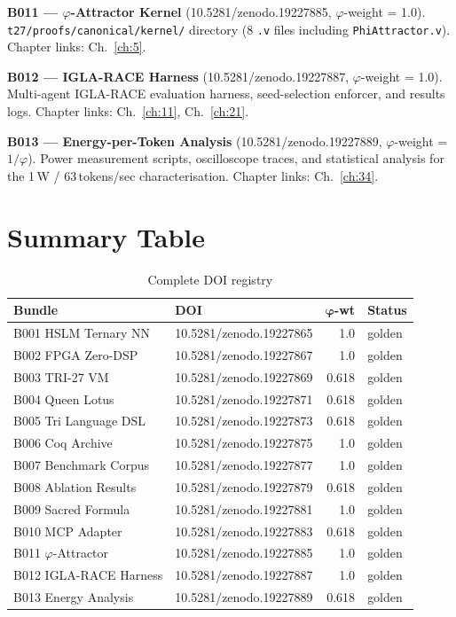\textbf{B011 --- $\varphi$-Attractor Kernel} (10.5281/zenodo.19227885, $\varphi$-weight = 1.0).
\texttt{t27/proofs/canonical/kernel/} directory (8 \texttt{.v} files including \texttt{PhiAttractor.v}). Chapter links: Ch.~\ref{ch:5}.

\textbf{B012 --- IGLA-RACE Harness} (10.5281/zenodo.19227887, $\varphi$-weight = 1.0).
Multi-agent IGLA-RACE evaluation harness, seed-selection enforcer, and results logs. Chapter links: Ch.~\ref{ch:11}, Ch.~\ref{ch:21}.

\textbf{B013 --- Energy-per-Token Analysis} (10.5281/zenodo.19227889, $\varphi$-weight = $1/\varphi$).
Power measurement scripts, oscilloscope traces, and statistical analysis for the 1\,W / 63\,tokens/sec characterisation. Chapter links: Ch.~\ref{ch:34}.

\section{Summary Table}

\begin{table}[h]
\centering
\caption{Complete DOI registry}
\label{tab:doi-registry}
\begin{tabular}{llrl}
\toprule
\textbf{Bundle} & \textbf{DOI} & $\bm{\varphi}$\textbf{-wt} & \textbf{Status} \\
\midrule
B001 HSLM Ternary NN      & 10.5281/zenodo.19227865 & 1.0   & golden \\
B002 FPGA Zero-DSP        & 10.5281/zenodo.19227867 & 1.0   & golden \\
B003 TRI-27 VM            & 10.5281/zenodo.19227869 & 0.618 & golden \\
B004 Queen Lotus          & 10.5281/zenodo.19227871 & 0.618 & golden \\
B005 Tri Language DSL     & 10.5281/zenodo.19227873 & 0.618 & golden \\
B006 Coq Archive          & 10.5281/zenodo.19227875 & 1.0   & golden \\
B007 Benchmark Corpus     & 10.5281/zenodo.19227877 & 1.0   & golden \\
B008 Ablation Results     & 10.5281/zenodo.19227879 & 0.618 & golden \\
B009 Sacred Formula       & 10.5281/zenodo.19227881 & 1.0   & golden \\
B010 MCP Adapter          & 10.5281/zenodo.19227883 & 0.618 & golden \\
B011 $\varphi$-Attractor  & 10.5281/zenodo.19227885 & 1.0   & golden \\
B012 IGLA-RACE Harness    & 10.5281/zenodo.19227887 & 1.0   & golden \\
B013 Energy Analysis      & 10.5281/zenodo.19227889 & 0.618 & golden \\
\bottomrule
\end{tabular}
\end{table}

